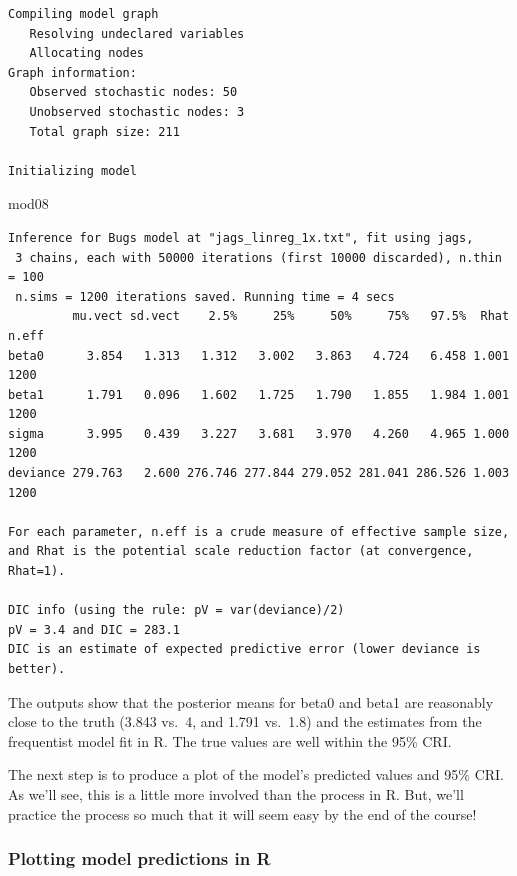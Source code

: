 \documentclass[
  13,
  letterpaper,
]{report}
\newenvironment{Shaded}{\begin{snugshade}}{\end{snugshade}}
\newcommand{\NormalTok}[1]{\textcolor[rgb]{0.00,0.23,0.31}{#1}}
\begin{document}
\begin{verbatim}
Compiling model graph
   Resolving undeclared variables
   Allocating nodes
Graph information:
   Observed stochastic nodes: 50
   Unobserved stochastic nodes: 3
   Total graph size: 211

Initializing model
\end{verbatim}

\begin{Shaded}
\begin{Highlighting}[]
\NormalTok{mod08}
\end{Highlighting}
\end{Shaded}

\begin{verbatim}
Inference for Bugs model at "jags_linreg_1x.txt", fit using jags,
 3 chains, each with 50000 iterations (first 10000 discarded), n.thin = 100
 n.sims = 1200 iterations saved. Running time = 4 secs
         mu.vect sd.vect    2.5%     25%     50%     75%   97.5%  Rhat n.eff
beta0      3.854   1.313   1.312   3.002   3.863   4.724   6.458 1.001  1200
beta1      1.791   0.096   1.602   1.725   1.790   1.855   1.984 1.001  1200
sigma      3.995   0.439   3.227   3.681   3.970   4.260   4.965 1.000  1200
deviance 279.763   2.600 276.746 277.844 279.052 281.041 286.526 1.003  1200

For each parameter, n.eff is a crude measure of effective sample size,
and Rhat is the potential scale reduction factor (at convergence, Rhat=1).

DIC info (using the rule: pV = var(deviance)/2)
pV = 3.4 and DIC = 283.1
DIC is an estimate of expected predictive error (lower deviance is better).
\end{verbatim}

The outputs show that the posterior means for beta0 and beta1 are
reasonably close to the truth (3.843 vs.~4, and 1.791 vs.~1.8) and the
estimates from the frequentist model fit in R. The true values are well
within the 95\% CRI.

The next step is to produce a plot of the model's predicted values and
95\% CRI. As we'll see, this is a little more involved than the process
in R. But, we'll practice the process so much that it will seem easy by
the end of the course!

\subsubsection{Plotting model predictions in
R}\label{plotting-model-predictions-in-r}
\end{document}
